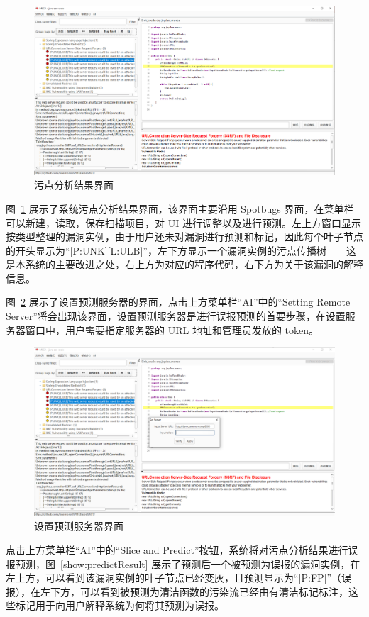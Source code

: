 \begin{figure}[H]
    \centering
    \includegraphics[width=0.8\linewidth]{FIGs/chapter4/taintAnalysis.png}
    \caption{污点分析结果界面}\label{show:taint}
\end{figure} 

图~\ref{show:taint} 展示了系统污点分析结果界面，该界面主要沿用 Spotbugs 界面，在菜单栏可以新建，读取，保存扫描项目，对 UI 进行调整以及进行预测。左上方窗口显示按类型整理的漏洞实例，由于用户还未对漏洞进行预测和标记，因此每个叶子节点的开头显示为“[P:UNK][L:ULB]”，左下方显示一个漏洞实例的污点传播树——这是本系统的主要改进之处，右上方为对应的程序代码，右下方为关于该漏洞的解释信息。

图~\ref{show:settingServer} 展示了设置预测服务器的界面，点击上方菜单栏“AI”中的“Setting Remote Server”将会出现该界面，设置预测服务器是进行误报预测的首要步骤，在设置服务器窗口中，用户需要指定服务器的 URL 地址和管理员发放的 token。

 \begin{figure}[H]
     \centering
     \includegraphics[width=0.8\linewidth]{FIGs/chapter4/settingServer.png}
     \caption{设置预测服务器界面}\label{show:settingServer}
 \end{figure} 

点击上方菜单栏“AI”中的“Slice and Predict”按钮，系统将对污点分析结果进行误报预测，图~\ref{show:predictResult} 展示了预测后一个被预测为误报的漏洞实例，在左上方，可以看到该漏洞实例的叶子节点已经变灰，且预测显示为“[P:FP]”（误报），在左下方，可以看到被预测为清洁函数的污染流已经由有清洁标记标注，这些标记用于向用户解释系统为何将其预测为误报。

